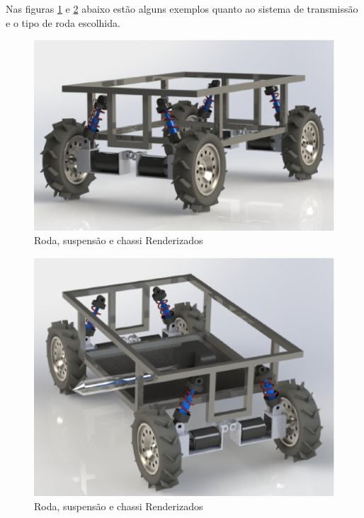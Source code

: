       Nas figuras \ref{SUSPENTION01} e \ref{SUSPENTION02} abaixo estão alguns exemplos quanto ao sistema de transmissão e o tipo de roda escolhida. 
      
      \begin{figure}[!htbp]
	\centering
	\label{SUSPENTION01}
	  \includegraphics[keepaspectratio=true,scale=0.5]{figuras/suspention01.eps}
	\caption{Roda, suspensão e chassi Renderizados}
      \end{figure}
      
      \begin{figure}[!htbp]
	\centering
	\label{SUSPENTION02}
	  \includegraphics[keepaspectratio=true,scale=0.5]{figuras/suspention02.eps}
	\caption{Roda, suspensão e chassi Renderizados}
      \end{figure}
      
